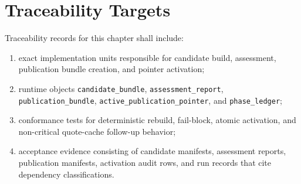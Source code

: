 \section{Traceability Targets}
Traceability records for this chapter shall include:
\begin{enumerate}[leftmargin=1.2cm]
    \item exact implementation units responsible for candidate build, assessment, publication bundle creation, and pointer activation;
    \item runtime objects \texttt{candidate\_bundle}, \texttt{assessment\_report}, \texttt{publication\_bundle}, \texttt{active\_publication\_pointer}, and \texttt{phase\_ledger};
    \item conformance tests for deterministic rebuild, fail-block, atomic activation, and non-critical quote-cache follow-up behavior;
    \item acceptance evidence consisting of candidate manifests, assessment reports, publication manifests, activation audit rows, and run records that cite dependency classifications.
\end{enumerate}
